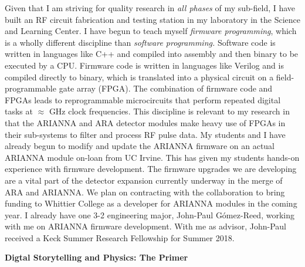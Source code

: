 \documentclass[../main.tex]{subfiles}
\begin{document}
Given that I am striving for quality research in \textit{all phases} of my sub-field, I have built an RF circuit fabrication and testing station in my laboratory in the Science and Learning Center.  I have begun to teach myself \textit{firmware programming}, which is a wholly different discipline than \textit{software programming.}  Software code is written in languages like C++ and compiled into assembly and then binary to be executed by a CPU.  Firmware code is written in languages like Verilog and is compiled directly to binary, which is translated into a physical circuit on a field-programmable gate array (FPGA).  The combination of firmware code and FPGAs leads to reprogrammable microcircuits that perform repeated digital tasks at $\approx$ GHz clock frequencies.  This discipline is relevant to my research in that the ARIANNA and ARA detector modules make heavy use of FPGAs in their sub-systems to filter and process RF pulse data.  My students and I have already begun to modify and update the ARIANNA firmware on an actual ARIANNA module on-loan from UC Irvine.  This has given my students hands-on experience with firmware development.  The firmware upgrades we are developing are a vital part of the detector expansion currently underway in the merge of ARA and ARIANNA.  We plan on contracting with the collaboration to bring funding to Whittier College as a developer for ARIANNA modules in the coming year.  I already have one 3-2 engineering major, John-Paul G\'{o}mez-Reed, working with me on ARIANNA firmware development.  With me as advisor, John-Paul received a Keck Summer Research Fellowship for Summer 2018.\\ \hspace{0.1cm}

\textbf{Digtal Storytelling and Physics: The Primer} \\ \hspace{0.1cm}
\end{document}

